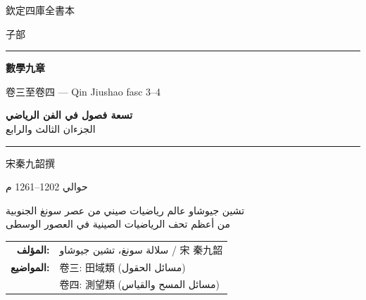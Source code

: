 \documentclass[11pt,a4paper]{article}
\begin{document}
\begin{titlepage}
\begin{center}
\vspace*{1.5cm}

{\fontsize{12}{16}\selectfont 欽定四庫全書本}

\vspace{0.8cm}

{\fontsize{10}{14}\selectfont 子部}

\vspace{1.5cm}

\rule{0.85\textwidth}{1.5pt}

\vspace{0.8cm}

{\fontsize{26}{34}\selectfont\bfseries\color{titlecolor} 數學九章}

\vspace{0.4cm}

{\fontsize{14}{20}\selectfont\color{notecolor} 卷三至卷四 --- Qin Jiushao fasc 3--4}

\vspace{0.6cm}

{\fontsize{18}{24}\selectfont\arabicfont\beginR\color{titlecolor}
\textbf{تسعة فصول في الفن الرياضي}\\[0.3cm]
{\large الجزءان الثالث والرابع}\endR}

\vspace{0.8cm}

\rule{0.85\textwidth}{1.5pt}

\vspace{1.5cm}

{\fontsize{12}{16}\selectfont 宋\quad 秦九韶\quad 撰}

\vspace{0.3cm}

{\fontsize{10}{14}\selectfont\color{notecolor} حوالي 1202--1261 م}

\vspace{0.8cm}

{\fontsize{11}{15}\selectfont\arabicfont\beginR\color{notecolor}
تشين جيوشاو \textbullet{} عالم رياضيات صيني من عصر سونغ الجنوبية\\
من أعظم تحف الرياضيات الصينية في العصور الوسطى
\endR}

\vspace{1.5cm}

{\fontsize{10}{14}\selectfont\color{notecolor}
\begin{tabular}{rl}
\textbf{المؤلف:} & سلالة سونغ، تشين جيوشاو / 宋 秦九韶 \\[0.5em]
\textbf{المواضيع:} & 卷三: 田域類 (مسائل الحقول) \\[0.3em]
               & 卷四: 測望類 (مسائل المسح والقياس) \\
\end{tabular}
}


\end{center}
\end{titlepage}
\end{document}
